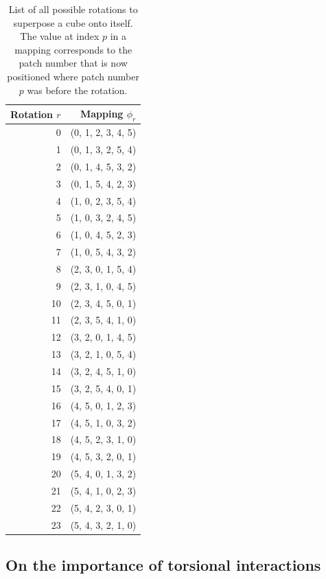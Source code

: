 \begin{table}[h]
    \centering
    \caption{List of all possible rotations to superpose a cube onto itself. The value at index \(p\) in a mapping corresponds to the patch number that is now positioned where patch number \(p\) was before the rotation.}
    \begin{tabular}{|r|r|}
    \hline
    Rotation \(r\) & Mapping \(\phi_r\) \\
    \hline
    \hline
    0 & (0,  1,  2,  3,  4,  5) \\
    1 & (0,  1,  3,  2,  5,  4) \\
    2 & (0,  1,  4,  5,  3,  2) \\
    3 & (0,  1,  5,  4,  2,  3) \\
    4 & (1,  0,  2,  3,  5,  4) \\
    5 & (1,  0,  3,  2,  4,  5) \\
    6 & (1,  0,  4,  5,  2,  3) \\
    7 & (1,  0,  5,  4,  3,  2) \\
    8 & (2,  3,  0,  1,  5,  4) \\
    9 & (2,  3,  1,  0,  4,  5) \\
    10 & (2,  3,  4,  5,  0,  1) \\
    11 & (2,  3,  5,  4,  1,  0) \\
    12 & (3,  2,  0,  1,  4,  5) \\
    13 & (3,  2,  1,  0,  5,  4) \\
    14 & (3,  2,  4,  5,  1,  0) \\
    15 & (3,  2,  5,  4,  0,  1) \\
    16 & (4,  5,  0,  1,  2,  3) \\
    17 & (4,  5,  1,  0,  3,  2) \\
    18 & (4,  5,  2,  3,  1,  0) \\
    19 & (4,  5,  3,  2,  0,  1) \\
    20 & (5,  4,  0,  1,  3,  2) \\
    21 & (5,  4,  1,  0,  2,  3) \\
    22 & (5,  4,  2,  3,  0,  1) \\
    23 & (5,  4,  3,  2,  1,  0) \\
    \hline
    \end{tabular}
    \label{tab:cubeRotations}
\end{table}

\subsection{On the importance of torsional interactions}

